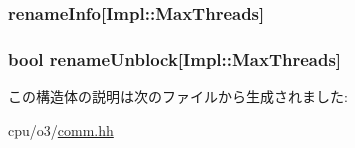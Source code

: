 \label{structTimeBufStruct_aafde0fc1bba1f774a65de44feb7ef3f5}
\hypertarget{structTimeBufStruct_a9aadb85753df262a74edcd9a6f5c8735}{
\subsubsection[{renameInfo}]{ {\bf renameInfo}\mbox{[}Impl::MaxThreads\mbox{]}}}
\label{structTimeBufStruct_a9aadb85753df262a74edcd9a6f5c8735}
\hypertarget{structTimeBufStruct_a90edcda648198fd45bdf495a159c65e0}{
\subsubsection[{renameUnblock}]{\setlength{\rightskip}{0pt plus 5cm}bool {\bf renameUnblock}\mbox{[}Impl::MaxThreads\mbox{]}}}
\label{structTimeBufStruct_a90edcda648198fd45bdf495a159c65e0}


この構造体の説明は次のファイルから生成されました:\begin{DoxyCompactItemize}
\item 
cpu/o3/\hyperlink{o3_2comm_8hh}{comm.hh}\end{DoxyCompactItemize}
